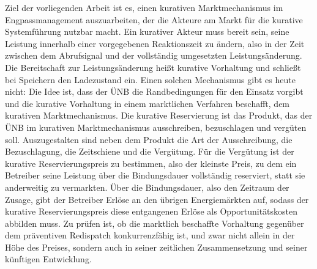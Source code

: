 Ziel der vorliegenden Arbeit ist es, einen kurativen Marktmechanismus im Engpassmanagement auszuarbeiten, der die Akteure am Markt für die kurative Systemführung nutzbar macht.
Ein kurativer Akteur muss bereit sein, seine Leistung innerhalb einer vorgegebenen Reaktionszeit zu ändern, also in der Zeit zwischen dem Abrufsignal und der vollständig umgesetzten Leistungsänderung.
Die Bereitschaft zur Leistungsänderung heißt kurative Vorhaltung und schließt bei Speichern den Ladezustand ein.
Einen solchen Mechanismus gibt es heute nicht: Die Idee ist, dass der \ac{ÜNB} die Randbedingungen für den Einsatz vorgibt und die kurative Vorhaltung in einem marktlichen Verfahren beschafft, dem kurativen Marktmechanismus.
Die kurative Reservierung ist das Produkt, das der \ac{ÜNB} im kurativen Marktmechanismus ausschreiben, bezuschlagen und vergüten soll.
Auszugestalten sind neben dem Produkt die Art der Ausschreibung, die Bezuschlagung, die Zeitschiene und die Vergütung.
Für die Vergütung ist der kurative Reservierungspreis zu bestimmen, also der kleinste Preis, zu dem ein Betreiber seine Leistung über die Bindungsdauer vollständig reserviert, statt sie anderweitig zu vermarkten.
Über die Bindungsdauer, also den Zeitraum der Zusage, gibt der Betreiber Erlöse an den übrigen Energiemärkten auf, sodass der kurative Reservierungspreis diese entgangenen Erlöse als Opportunitätskosten abbilden muss.
Zu prüfen ist, ob die marktlich beschaffte Vorhaltung gegenüber dem präventiven Redispatch konkurrenzfähig ist, und zwar nicht allein in der Höhe des Preises, sondern auch in seiner zeitlichen Zusammensetzung und seiner künftigen Entwicklung.


